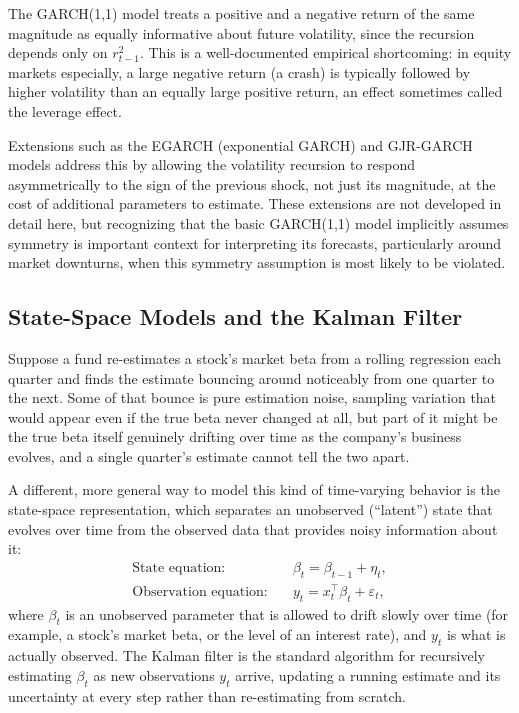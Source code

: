 \documentclass[../ai_in_finance]{subfiles}
\begin{document}
The GARCH(1,1) model treats a positive and a negative return of the same magnitude as equally informative about future volatility, since the recursion depends only on $r_{t-1}^2$. This is a well-documented empirical shortcoming: in equity markets especially, a large negative return (a crash) is typically followed by higher volatility than an equally large positive return, an effect sometimes called the leverage effect.

Extensions such as the EGARCH (exponential GARCH) and GJR-GARCH models address this by allowing the volatility recursion to respond asymmetrically to the sign of the previous shock, not just its magnitude, at the cost of additional parameters to estimate. These extensions are not developed in detail here, but recognizing that the basic GARCH(1,1) model implicitly assumes symmetry is important context for interpreting its forecasts, particularly around market downturns, when this symmetry assumption is most likely to be violated.

\subsection{State-Space Models and the Kalman Filter}
\label{sec:kalman-example}

Suppose a fund re-estimates a stock's market beta from a rolling regression each quarter and finds the estimate bouncing around noticeably from one quarter to the next. Some of that bounce is pure estimation noise, sampling variation that would appear even if the true beta never changed at all, but part of it might be the true beta itself genuinely drifting over time as the company's business evolves, and a single quarter's estimate cannot tell the two apart.

A different, more general way to model this kind of time-varying behavior is the state-space representation, which separates an unobserved (``latent'') state that evolves over time from the observed data that provides noisy information about it:
\begin{align*}
\text{State equation:} \quad & \beta_t = \beta_{t-1} + \eta_t, \\
\text{Observation equation:} \quad & y_t = x_t^\top \beta_t + \varepsilon_t,
\end{align*}
where $\beta_t$ is an unobserved parameter that is allowed to drift slowly over time (for example, a stock's market beta, or the level of an interest rate), and $y_t$ is what is actually observed. The Kalman filter is the standard algorithm for recursively estimating $\beta_t$ as new observations $y_t$ arrive, updating a running estimate and its uncertainty at every step rather than re-estimating from scratch.
\end{document}
